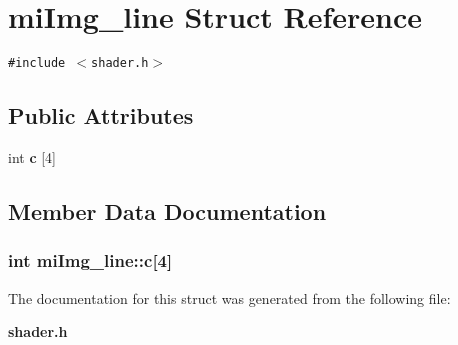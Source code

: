 \section{mi\-Img\_\-line Struct Reference}
\label{structmiImg__line}
{\tt \#include $<$shader.h$>$}

\subsection*{Public Attributes}
\begin{CompactItemize}
\item 
int {\bf c} [4]
\end{CompactItemize}


\subsection{Member Data Documentation}
\subsubsection{\setlength{\rightskip}{0pt plus 5cm}int {\bf mi\-Img\_\-line::c}[4]}\label{structmiImg__line_o0}




The documentation for this struct was generated from the following file:\begin{CompactItemize}
\item 
{\bf shader.h}\end{CompactItemize}
